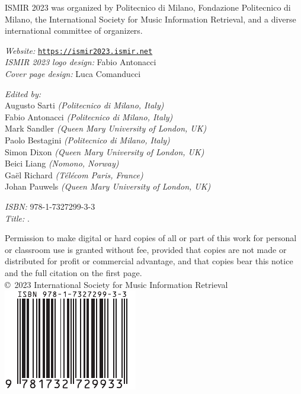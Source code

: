 ISMIR 2023 was organized by Politecnico di Milano, Fondazione Politecnico di Milano, the International Society for Music Information Retrieval, and a diverse international committee of organizers.

\vfill

\emph{Website:} \href{https://ismir2023.ismir.net}{\nolinkurl{https://ismir2023.ismir.net}}\\[1em]
\emph{ISMIR 2023 logo design:} Fabio Antonacci\\
\emph{Cover page design:} Luca Comanducci

\vfill

\emph{Edited by:}\\
Augusto Sarti \emph{(Politecnico di Milano, Italy)}\\
Fabio Antonacci \emph{(Politecnico di Milano, Italy)}\\
Mark Sandler \emph{(Queen Mary University of London, UK)}\\
Paolo Bestagini \emph{(Politecnico di Milano, Italy)}\\
Simon Dixon \emph{(Queen Mary University of London, UK)}\\
Beici Liang \emph{(Nomono, Norway)}\\
Gaël Richard \emph{(Télécom Paris, France)}\\
Johan Pauwels \emph{(Queen Mary University of London, UK)}

\vfill

\emph{ISBN:} 978-1-7327299-3-3\\[1em]
\emph{Title:} \proctitle.

\vfill

Permission to make digital or hard copies of all or part of this work for personal or classroom use is granted without fee, provided that copies are not made or distributed for profit or commercial advantage, and that copies bear this notice and the full citation on the first page.\\[2em]
\copyright~2023 International Society for Music Information Retrieval\\[1em]
\includegraphics{external/isbn_9781732729933}




